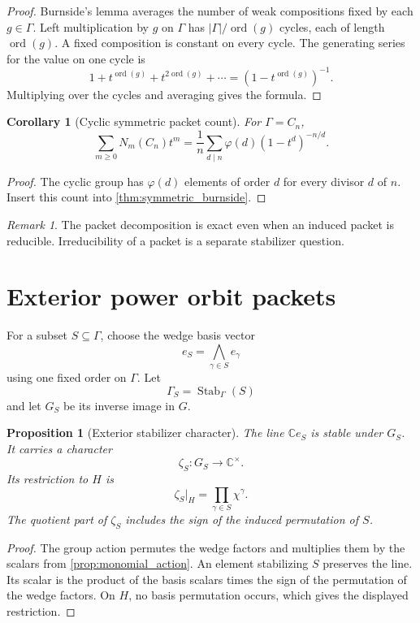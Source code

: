 \documentclass{aomart}
\newtheorem{proposition}[proposition]{Proposition}
\newtheorem{corollary}[corollary]{Corollary}
\theoremstyle{definition}
\theoremstyle{remark}
\newtheorem{remark}[remark]{Remark}
\newcommand{\CC}{\mathbb C}
\newcommand{\ord}{\operatorname{ord}}
\newcommand{\Stab}{\operatorname{Stab}}
\newcommand{\abs}[1]{\left\lvert#1\right\rvert}
\begin{document}
\begin{proof}
Burnside's lemma averages the number of weak compositions fixed by each \(g\in\Gamma\). Left multiplication by \(g\) on \(\Gamma\) has \(\abs\Gamma/\ord(g)\) cycles, each of length \(\ord(g)\). A fixed composition is constant on every cycle. The generating series for the value on one cycle is
\[
1+t^{\ord(g)}+t^{2\ord(g)}+\cdots
=
\left(1-t^{\ord(g)}\right)^{-1}.
\]
Multiplying over the cycles and averaging gives the formula.
\end{proof}

\begin{corollary}[Cyclic symmetric packet count]\label{cor:cyclic_symmetric_count}
For \(\Gamma=C_n\),
\[
\sum_{m\geq0}N_m(C_n)t^m
=
\frac1n
\sum_{d\mid n}
\varphi(d)
\left(1-t^d\right)^{-n/d}.
\]
\end{corollary}

\begin{proof}
The cyclic group has \(\varphi(d)\) elements of order \(d\) for every divisor \(d\) of \(n\). Insert this count into \cref{thm:symmetric_burnside}.
\end{proof}

\begin{remark}\label{rem:symmetric_reducibility}
The packet decomposition is exact even when an induced packet is reducible. Irreducibility of a packet is a separate stabilizer question.
\end{remark}

\section{Exterior power orbit packets}\label{sec:exterior}

For a subset \(S\subseteq\Gamma\), choose the wedge basis vector
\[
e_S
=
\bigwedge_{\gamma\in S}e_\gamma
\]
using one fixed order on \(\Gamma\). Let
\[
\Gamma_S=\Stab_\Gamma(S)
\]
and let \(G_S\) be its inverse image in \(G\).

\begin{proposition}[Exterior stabilizer character]\label{prop:exterior_stabilizer_character}
The line \(\CC e_S\) is stable under \(G_S\). It carries a character
\[
\zeta_S:G_S\longrightarrow\CC^{\times}.
\]
Its restriction to \(H\) is
\[
\boxed{
\zeta_S|_H
=
\prod_{\gamma\in S}\chi^\gamma.
}
\]
The quotient part of \(\zeta_S\) includes the sign of the induced permutation of \(S\).
\end{proposition}

\begin{proof}
The group action permutes the wedge factors and multiplies them by the scalars from \cref{prop:monomial_action}. An element stabilizing \(S\) preserves the line. Its scalar is the product of the basis scalars times the sign of the permutation of the wedge factors. On \(H\), no basis permutation occurs, which gives the displayed restriction.
\end{proof}
\end{document}
